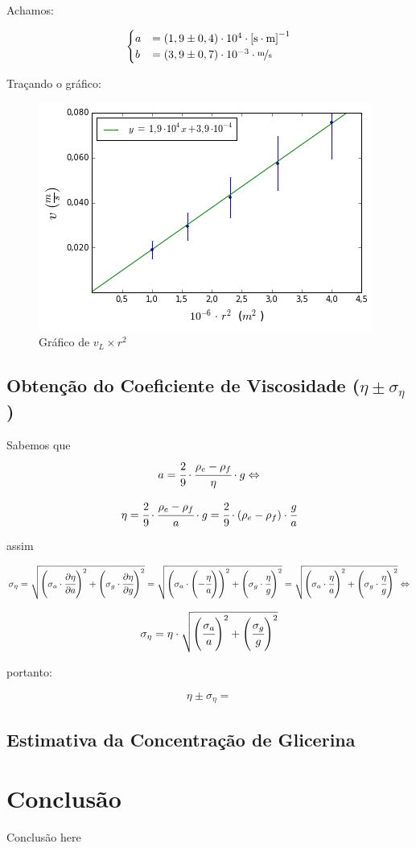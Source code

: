 \documentclass[english,brazil]{article}
\begin{document}
			Achamos:

			\[
				\begin{cases}
					a & =\left(1,9\pm0,4\right)\cdot10^{4}\cdot\unit{\left[s\cdot m\right]^{-1}}\\
					b & =\left(3,9\pm0,7\right)\cdot10^{-3}\cdot\unit{\unitfrac{m}{s}}
				\end{cases}
			\]
			
			Traçando o gráfico:
			\begin{figure}[!ht]
				\centering
					\includegraphics[scale=0.747]{exp05-vcorrigida.png}
				\caption{Gráfico de $v_{L}\times r^{2}$}
			\end{figure}


		\subsection{Obtenção do Coeficiente de Viscosidade ($\eta\pm\sigma_{\eta}$)}

			Sabemos que 
			$$a=\cfrac{2}{9}\cdot\cfrac{\rho_{e}-\rho_{f}}{\eta}\cdot g\Leftrightarrow$$
		
		\begin{equation}
			\eta=\cfrac{2}{9}\cdot\cfrac{\rho_{e}-\rho_{f}}{a}\cdot g=\cfrac{2}{9}\cdot\left(\rho_{e}-\rho_{f}\right)\cdot\cfrac{g}{a}
		\end{equation}

			assim 
			
			$$\sigma_{\eta}=\sqrt{\left(\sigma_{a}\cdot\cfrac{\partial\eta}{\partial a}\right)^{2}+\left(\sigma_{g}\cdot\cfrac{\partial\eta}{\partial g}\right)^{2}}=\sqrt{\left(\sigma_{a}\cdot\left(-\cfrac{\eta}{a}\right)\right)^{2}+\left(\sigma_{g}\cdot\cfrac{\eta}{g}\right)^{2}}=\sqrt{\left(\sigma_{a}\cdot\cfrac{\eta}{a}\right)^{2}+\left(\sigma_{g}\cdot\cfrac{\eta}{g}\right)^{2}} \Leftrightarrow$$
			
			\begin{equation}
				\sigma_{\eta} = \eta\cdot\sqrt{\left(\cfrac{\sigma_{a}}{a}\right)^{2}+\left(\cfrac{\sigma_{g}}{g}\right)^{2}}
			\end{equation}


			portanto:

			$$\eta\pm\sigma_{\eta}=$$


		\subsection{Estimativa da Concentração de Glicerina}


	\section{Conclusão}

	Conclusão here 
	
\end{document}

